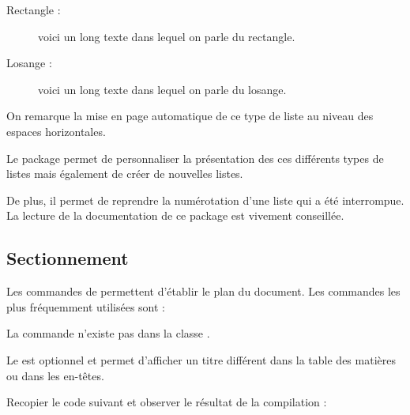{\NewFont\reset
\begin{SideBySideExample}
    \begin{description}
        \item[Rectangle :] voici un long texte dans
            lequel on parle du rectangle.
        \item[Losange :] voici un long texte dans lequel
            on parle du losange.
    \end{description}
    On remarque la mise en page automatique
    de ce type de liste au niveau
    des espaces horizontales.
\end{SideBySideExample}
\bigskip}

\begin{info}
    Le package  permet de personnaliser la présentation des ces différents types de listes mais également de créer de nouvelles listes.\par
    De plus, il permet de reprendre la numérotation d'une liste  qui a été interrompue. La lecture de la documentation de ce package est vivement conseillée.
\end{info}
\subsection{Sectionnement}

Les commandes de  permettent d'établir le plan du document. Les commandes les plus fréquemment utilisées sont :\medskip

\begin{obeylines}
\end{obeylines}

\begin{info}
    La commande  n'existe pas dans la classe .\par
    Le  est optionnel et permet d'afficher un titre différent dans la table des matières ou dans les en-têtes.
\end{info}

Recopier le code suivant et observer le résultat de la compilation :


